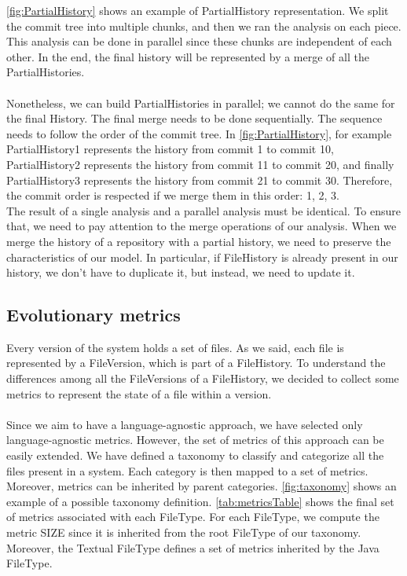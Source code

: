 \autoref{fig:PartialHistory} shows an example of PartialHistory representation. 
We split the commit tree into multiple chunks, and then we ran the analysis on each piece. 
This analysis can be done in parallel since these chunks are independent of each other. 
In the end, the final history will be represented by a merge of all the PartialHistories. \\
\\
Nonetheless, we can build PartialHistories in parallel; we cannot do the same for the final History. 
The final merge needs to be done sequentially. The sequence needs to follow the order of the commit tree. 
In \autoref{fig:PartialHistory}, for example
PartialHistory1 represents the history from commit 1 to commit 10, 
PartialHistory2 represents the history from commit 11 to commit 20, and finally 
PartialHistory3 represents the history from commit 21 to commit 30.
Therefore, the commit order is respected if we merge them in this order: 1, 2, 3. 
\\
The result of a single analysis and a parallel analysis must be identical. 
To ensure that, we need to pay attention to the merge operations of our analysis.
When we merge the history of a repository with a partial history, we need to preserve the characteristics of our model. 
In particular, if FileHistory is already present in our history, we don't have to duplicate it, but instead, we need to update it. 

\label{s:evolutionaryMetrics}
\subsection*{Evolutionary metrics}
Every version of the system holds a set of files. 
As we said, each file is represented by a FileVersion, which is part of a FileHistory. 
To understand the differences among all the FileVersions of a FileHistory,
we decided to collect some metrics to represent the state of a file within a version.\\
\\
Since we aim to have a language-agnostic approach, we have selected only language-agnostic metrics. 
However, the set of metrics of this approach can be easily extended.
We have defined a taxonomy to classify and categorize all the files present in a system. 
Each category is then mapped to a set of metrics. Moreover, metrics can be inherited by parent categories. 
\autoref{fig:taxonomy} shows an example of a possible taxonomy definition. \autoref{tab:metricsTable} shows the final set of metrics associated with each FileType. For each FileType, we compute the metric SIZE since it is inherited from the root FileType of our taxonomy. Moreover, the Textual FileType defines a set of metrics inherited by the Java FileType. 
\\

